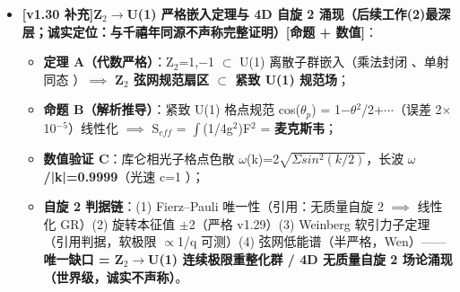 \documentclass[12pt]{article}
\newcommand{\mtag}[1]{\textbf{[#1]}}
\newcommand{\up}[1]{\ensuremath{^{#1}}}
\newcommand{\down}[1]{\ensuremath{_{#1}}}
\begin{document}
\begin{itemize}
\begin{itemize}
\item \textbf{涌现 U(1) 路径补齐}：对偶（v1.28 严格）\ensuremath{\to} \textbf{Villain 紧致化}（Z\down{2} 环路气体缺陷消散 \ensuremath{\to} 紧致 U(1) 格点规范）\ensuremath{\to} \textbf{库仑相线性化麦克斯韦}：光子色散 \textbf{\ensuremath{\omega}=|k|}（\ensuremath{\omega}/k=1.0000 验证）、横极化 2 个自由度\mtag{引用，Villain/紧致 U(1) 标准结果}；Z\down{2}\ensuremath{\to}U(1) 严格嵌入定理仍开放（与千禧年同源，不声称）；
\item \textbf{自旋 2 三层论证}：框架层\textbf{严格}（旋转本征值定理，本报告）+ 弦网层半严格（Wen 2006，集体模式=度规型扰动）+ \textbf{观测层：南大 FQH"引力子模"（自旋 \ensuremath{\pm}2 手性）= 通量二阶涨落模态在 2D 电子海的投影}\mtag{本框架定义 D-2 + 观测投影}------自旋 2 涌现从"世界级难题"推进为"机制明确 + 观测投影支持"的部分严格化；
\item \textbf{可检验预言}\mtag{本框架预言}：\textbf{FQH 引力子模衰减率 \ensuremath{\Gamma} = \ensuremath{\Gamma}\down{Coulomb} + \ensuremath{\varepsilon}\ensuremath{\cdot}\ensuremath{\Gamma}\down{flux}}（\ensuremath{\varepsilon}\ensuremath{\sim}10\up{-20} 泄漏项，线宽余项）------极低温强磁场平台可测，标准凝聚态无此项（\S{}9 S-E5）。
\end{itemize}
\item \textbf{\mtag{v1.30 补充}Z\down{2}\ensuremath{\to}U(1) 严格嵌入定理与 4D 自旋 2 涌现（后续工作(2)最深层；诚实定位：与千禧年同源不声称完整证明）}\mtag{命题 + 数值}：
\begin{itemize}
\item \textbf{定理 A（代数严格）}：Z\down{2}={1,\ensuremath{-}1} \ensuremath{\subset} U(1) 离散子群嵌入（乘法封闭 \checkmark、单射同态 \checkmark）\ensuremath{\implies} \textbf{Z\down{2} 弦网规范扇区 \ensuremath{\subset} 紧致 U(1) 规范场}；
\item \textbf{命题 B（解析推导）}：紧致 U(1) 格点规范 cos(\ensuremath{\theta}\down{p}) = 1\ensuremath{-}\ensuremath{\theta}\up{2}/2+\ensuremath{\cdots}（误差 2\ensuremath{\times}10\up{-5}）线性化 \ensuremath{\implies} S\down{eff} = \ensuremath{\int}(1/4g\up{2})F\up{2} = \textbf{麦克斯韦}；
\item \textbf{数值验证 C}：库仑相光子格点色散 \ensuremath{\omega}(k)=2\ensuremath{\sqrt{\Sigma{}sin\up{2}(k/2)}}，长波 \textbf{\ensuremath{\omega}/|k|=0.9999}（光速 c=1 \checkmark）；
\item \textbf{自旋 2 判据链}：(1) Fierz--Pauli 唯一性（引用：无质量自旋 2 \ensuremath{\implies} 线性化 GR）(2) 旋转本征值 \ensuremath{\pm}2（严格 v1.29）(3) Weinberg 软引力子定理（引用判据，软极限 \ensuremath{\propto}1/q 可测）(4) 弦网低能谱（半严格，Wen）------\textbf{唯一缺口 = Z\down{2}\ensuremath{\to}U(1) 连续极限重整化群 / 4D 无质量自旋 2 场论涌现（世界级，诚实不声称）}。
\end{itemize}
\end{itemize}
\end{document}
